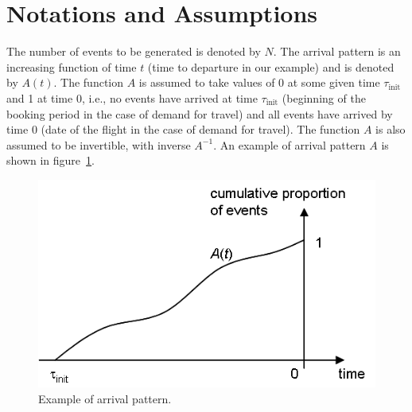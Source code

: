 \documentclass[12pt]{article} %
\begin{document}
\section{Notations and Assumptions}
%
The number of events to be generated is denoted by $N$. The arrival
pattern is an increasing function of time $t$ (time to departure in
our example) and is denoted by $A(t)$. The function $A$ is assumed to
take values of 0 at some given time $\tau_\text{init}$ and 1 at time
0, i.e., no events have arrived at time $\tau_\text{init}$ (beginning
of the booking period in the case of demand for travel) and all events
have arrived by time 0 (date of the flight in the case of demand for
travel). The function $A$ is also assumed to be invertible, with
inverse $A^{-1}$. An example of arrival pattern $A$ is shown in
figure~\ref{fig:arrivalPattern}.
\begin{figure}[h`!]
\centering
\includegraphics{arrivalPattern}
\vspace{-4mm}
\caption{Example of arrival pattern.}
\label{fig:arrivalPattern}
\end{figure}
%
%
\end{document}
